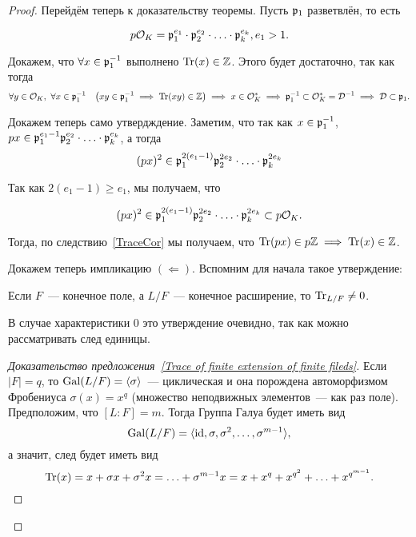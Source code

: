 \begin{proof}
	 	Перейдём теперь к доказательству теоремы. Пусть $\mathfrak{p}_{1}$ разветвлён,  то есть 

	 	\[
	 		p\mathcal{O}_{K} = \mathfrak{p}_1^{e_1} \cdot \mathfrak{p}_{2}^{e_2} \cdot \ldots \cdot \mathfrak{p}_{k}^{e_k}, e_1 > 1.
	 	\]

	 	Докажем, что $\forall x \in \mathfrak{p}_{1}^{-1}$ выполнено $\operatorname{Tr}(x) \in \mathbb{Z}$. Этого будет достаточно, так как тогда
	 	\[
	 		\forall y \in \cO_{K}, \ \forall x \in \fp_{1}^{-1} \quad   \lr*{xy \in \fp_{1}^{-1} \implies \Tr(xy) \in \Z} \implies x \in \cO_{K}^{*} \implies \fp_{1}^{-1} \subset \cO_{K}^{*} = \cD^{-1} \implies \cD \subset \fp_{1}.    
	 	\]

	 	Докажем теперь само утвердждение. Заметим, что так как $x \in \mathfrak{p}_{1}^{-1}$,  $px \in \mathfrak{p}_{1}^{e_1 - 1} \mathfrak{p}_{2}^{e_2} \cdot \ldots \cdot \mathfrak{p}_{k}^{e_k}$, а тогда
	 	\[
	 		(px)^2 \in \mathfrak{p}_1^{2(e_1 - 1)} \mathfrak{p}_{2}^{2e_2} \cdot \ldots \cdot \mathfrak{p}_{k}^{2e_k}
	 	\]

	 	Так как $2(e_1 - 1) \ge e_1$, мы получаем, что 

	 	\[
	 		(px)^2 \in \mathfrak{p}_1^{2(e_1 - 1)} \mathfrak{p}_{2}^{2e_2} \cdot \ldots \cdot \mathfrak{p}_{k}^{2e_k} \subset p\mathcal{O}_{K}.
	 	\]

	 	Тогда, по следствию~\ref{TraceCor} мы получаем, что $\operatorname{Tr}(px) \in p\mathbb{Z} \implies \operatorname{Tr}(x) \in \mathbb{Z}$.

	 	Докажем теперь импликацию $(\mathbf{\Leftarrow})$. Вспомним для начала такое утверждение:

	 	\begin{statement}\label{Trace of finite extension of finite fileds} 
	 		Если $F$~--- конечное поле, а $L/F$~--- конечное расширение, то $\operatorname{Tr}_{L/F} \neq 0$.
	 	\end{statement}

	 	\begin{remark}
	 		В случае характеристики 0 это утверждение очевидно,  так как можно рассматривать след единицы. 
	 	\end{remark}

	 	\begin{proof}[Доказательство предложения~\ref{Trace of finite extension of finite fileds}]
	 		Если $|F| = q$, то $\operatorname{Gal}(L/F) = \langle \sigma \rangle$~--- циклическая и она порождена автоморфизмом Фробениуса $\sigma(x) = x^q$ (множество неподвижных элементов~--- как раз поле). Предположим, что $[L \colon F] = m$. Тогда Группа Галуа будет иметь вид 
	 		\[
	 			\operatorname{Gal}(L/F) = \langle \operatorname{id}, \sigma, \sigma^2, \ldots, \sigma^{m - 1} \rangle,
	 		\]
	 		а значит, след будет иметь вид 
	 		\[
	 			\operatorname{Tr}(x) = x + \sigma x + \sigma^2 x = \ldots + \sigma^{m - 1}x = x + x^q + x^{q^2} + \ldots + x^{q^{m - 1}}.
	 		\]


\end{proof}
\end{proof}

